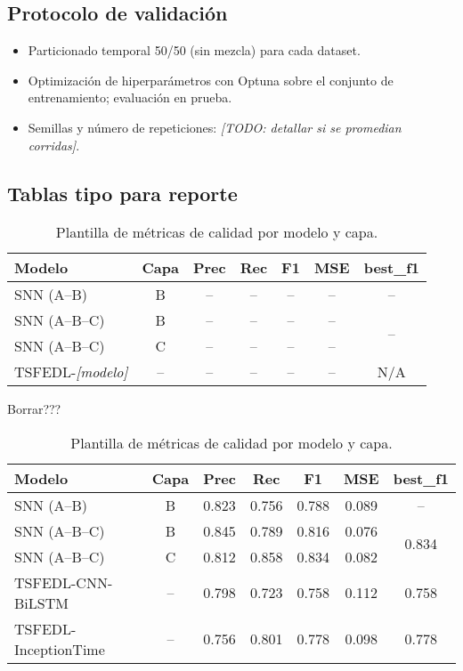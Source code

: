 \subsection{Protocolo de validación}
\begin{itemize}
    \item Particionado temporal 50/50 (sin mezcla) para cada dataset.
    \item Optimización de hiperparámetros con Optuna sobre el conjunto de entrenamiento; evaluación en prueba. 
    \item Semillas y número de repeticiones: \textit{[TODO: detallar si se promedian corridas]}.
\end{itemize}

\subsection{Tablas tipo para reporte}
\begin{table}[htbp]
\centering
\small
\begin{tabular}{lcccccc}
\hline\hline
\textbf{Modelo} & \textbf{Capa} & \textbf{Prec} & \textbf{Rec} & \textbf{F1} & \textbf{MSE} & \textbf{best\_f1} \\
\hline
SNN (A--B) & B & -- & -- & -- & -- & -- \\
SNN (A--B--C) & B & -- & -- & -- & -- & \multirow{2}{*}{--} \\
SNN (A--B--C) & C & -- & -- & -- & -- & \\
TSFEDL-\textit{[modelo]} & -- & -- & -- & -- & -- & N/A \\
\hline\hline
\end{tabular}
\caption{Plantilla de métricas de calidad por modelo y capa.}
\label{tab:metricas-calidad}
\end{table}


Borrar???
\begin{table}[htbp]
\centering
\small
\begin{tabular}{lcccccc}
\hline\hline
\textbf{Modelo} & \textbf{Capa} & \textbf{Prec} & \textbf{Rec} & \textbf{F1} & \textbf{MSE} & \textbf{best\_f1} \\
\hline
SNN (A--B) & B & 0.823 & 0.756 & 0.788 & 0.089 & -- \\
SNN (A--B--C) & B & 0.845 & 0.789 & 0.816 & 0.076 & \multirow{2}{*}{0.834} \\
SNN (A--B--C) & C & 0.812 & 0.858 & 0.834 & 0.082 & \\
TSFEDL-CNN-BiLSTM & -- & 0.798 & 0.723 & 0.758 & 0.112 & 0.758 \\
TSFEDL-InceptionTime & -- & 0.756 & 0.801 & 0.778 & 0.098 & 0.778 \\
\hline\hline
\end{tabular}
\caption{Plantilla de métricas de calidad por modelo y capa.}
\label{tab:metricas-calidad}
\end{table}

